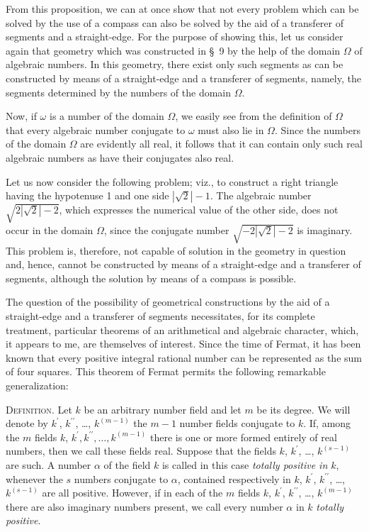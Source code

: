 \documentclass[11pt,oneside]{book}
\begin{document}
From this proposition, we can at once show that
not every problem which can be solved by the use of
a compass can also be solved by the aid of a transferer
of segments and a straight-edge. For the purpose
of showing this, let us consider again that geometry
which was constructed in \S~9 by the help of the
domain $\Omega$ of algebraic numbers. In this geometry,
there exist only such segments as can be constructed
by means of a straight-edge and a transferer of segments,
namely, the segments determined by the numbers
of the domain $\Omega$.

Now, if $\omega$ is a number of the domain $\Omega$, we easily
see from the definition of $\Omega$ that every algebraic number
conjugate to $\omega$ must also lie in $\Omega$. Since the numbers
of the domain $\Omega$ are evidently all real, it follows
that it can contain only such real algebraic numbers
as have their conjugates also real.

Let us now consider the following problem; viz.,
to construct a right triangle having the hypotenuse
1 and one side $|\sqrt{2}| - 1$. The algebraic number
$\sqrt{2|\sqrt{2}| - 2}$, which expresses the numerical value of
the other side, does not occur in the domain $\Omega$, since
the conjugate number $\sqrt{-2|\sqrt{2}| - 2}$ is imaginary.
This problem is, therefore, not capable of solution in
the geometry in question and, hence, cannot be constructed
by means of a straight-edge and a transferer
of segments, although the solution by means of a compass
is possible.

\label{p38}

The question of the possibility of geometrical constructions
by the aid of a straight-edge and a transferer
of segments necessitates, for its complete treatment,
particular theorems of an arithmetical and algebraic
character, which, it appears to me, are themselves of
interest.
Since the time of Fermat, it has been known that
every positive integral rational number can be represented
as the sum of four squares. This theorem of
Fermat permits the following remarkable generalization:

{\scshape Definition}. Let $k$ be an arbitrary number field
and let $m$ be its degree. We will denote by $k^{\prime}$, $k^{\prime\prime}$,
\ldots, $k^{(m-1)}$ the $m-1$ number fields conjugate to $k$.
If, among the $m$ fields $k$, $k^{\prime}, k^{\prime\prime}, \ldots, k^{(m-1)}$ there is
one or more formed entirely of real numbers, then we
call these fields real. Suppose that the fields $k$, $k^\prime$,
\ldots, $k^{(s-1)}$ are such. A number $\alpha$ of the field $k$ is called
in this case {\em totally positive in $k$}, whenever the $s$ numbers
conjugate to $\alpha$, contained respectively in $k$, $k^\prime$,
$k^{\prime\prime}$, \ldots, $k^{(s-1)}$ are all positive. However, if in each
of the $m$ fields $k$, $k^\prime$, $k^{\prime\prime}$, \ldots, $k^{(m-1)}$ there are also imaginary
numbers present, we call every number $\alpha$ in
$k$ {\em totally positive}.
\end{document}
